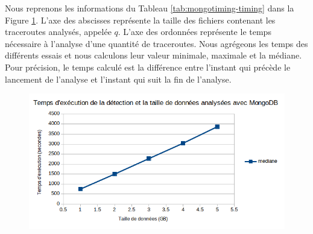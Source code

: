 

\begin{table}[h]
	\captionsetup{justification=centering}
\caption{Les temps d'exécution d'analyse de traceroutes en fonction de la taille de données avec MongoDB}
\label{tab:mongotiming-timing}
\end{table}

Nous reprenons les informations du Tableau \ref{tab:mongotiming-timing} dans la Figure \ref{fig:mongodbtiming}. L'axe  des abscisses représente la taille des fichiers contenant les traceroutes  analysés, appelée  $q$. L'axe  des ordonnées  représente le temps nécessaire à l'analyse d'une quantité  de traceroutes. Nous agrégeons les temps des différents essais et nous calculons  leur valeur minimale, maximale et la médiane.
Pour précision, le temps calculé est la différence entre l'instant  qui précède le lancement de l'analyse et l'instant qui suit la fin de l'analyse.

\begin{figure}[h]
	\centering
	\captionsetup{justification=centering}
	\includegraphics[width=0.7\linewidth]{illustrations/mongoDBtiming_0}
	\caption{}
	\label{fig:mongodbtiming}
\end{figure}

